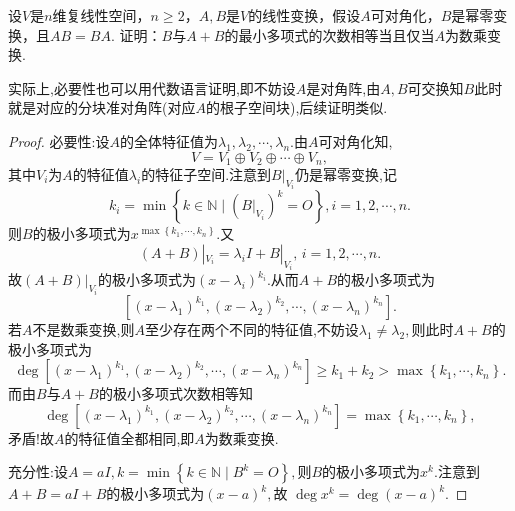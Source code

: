 \documentclass[../../main.tex]{subfiles}%
\begin{document}
\begin{example}
设$V$是$n$维复线性空间，$n \geqslant 2$，$A,B$是$V$的线性变换，假设$A$可对角化，$B$是幂零变换，且$AB = BA$. 证明：$B$与$A + B$的最小多项式的次数相等当且仅当$A$为数乘变换.
\end{example}
\begin{note}
实际上,必要性也可以用代数语言证明,即不妨设$A$是对角阵,由$A,B$可交换知$B$此时就是对应的分块准对角阵(对应$A$的根子空间块),后续证明类似.
\end{note}
\begin{proof}

{\heiti 必要性:}设$A$的全体特征值为$\lambda_1,\lambda_2,\cdots,\lambda_n$.由$A$可对角化知,
$$V=V_1\oplus V_2\oplus \cdots \oplus V_n,$$
其中$V_i$为$A$的特征值$\lambda_i$的特征子空间.注意到$B|_{V_i}$仍是幂零变换,记
$$k_i=\min\left\{k\in\mathbb{N}\mid (B|_{V_i})^k=O\right\},i=1,2,\cdots,n.$$
则$B$的极小多项式为$x^{\max\left\{k_1,\cdots,k_n\right\}}.$又
$$(A+B)|_{V_i}=\lambda_i I+B|_{V_i},\,i=1,2,\cdots,n.$$
故$(A+B)|_{V_i}$的极小多项式为$(x-\lambda_i)^{k_i}.$从而$A+B$的极小多项式为
$$\left[(x-\lambda_1)^{k_1},(x-\lambda_2)^{k_2},\cdots,(x-\lambda_n)^{k_n}\right].$$
若$A$不是数乘变换,则$A$至少存在两个不同的特征值,不妨设$\lambda_1\neq \lambda_2,$则此时$A+B$的极小多项式为
$$\deg\left[(x-\lambda_1)^{k_1},(x-\lambda_2)^{k_2},\cdots,(x-\lambda_n)^{k_n}\right]\geqslant k_1+k_2>\max\left\{k_1,\cdots,k_n\right\}.$$
而由$B$与$A+B$的极小多项式次数相等知
$$\deg\left[(x-\lambda_1)^{k_1},(x-\lambda_2)^{k_2},\cdots,(x-\lambda_n)^{k_n}\right]=\max\left\{k_1,\cdots,k_n\right\},$$
矛盾!故$A$的特征值全都相同,即$A$为数乘变换.

{\heiti 充分性:}设$A=aI,k=\min\left\{k\in\mathbb{N}\mid B^k=O\right\},$则$B$的极小多项式为$x^k.$注意到$A+B=aI+B$的极小多项式为$(x-a)^k,$故
$\deg x^k=\deg(x-a)^k.$
\end{proof}
\end{document}
